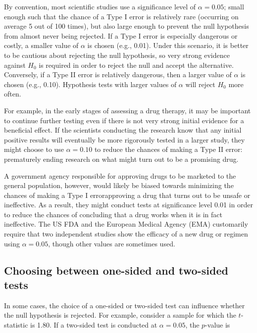 \label{significanceLevel}

By convention, most scientific studies use a significance level of $\alpha = 0.05$; small enough such that the chance of a Type I error is relatively rare (occurring on average 5 out of 100 times), but also large enough to prevent the null hypothesis from almost never being rejected. If a Type I error is especially dangerous or costly, a smaller value of $\alpha$ is chosen (e.g., 0.01). Under this scenario, it is better to be cautious about rejecting the null hypothesis, so very strong evidence against $H_0$ is required in order to reject the null and accept the alternative. Conversely, if a Type II error is relatively dangerous, then a larger value of $\alpha$ is chosen (e.g., 0.10). Hypothesis tests with larger values of $\alpha$ will reject $H_0$ more often.

For example, in the early stages of assessing a drug therapy, it may be important to continue further testing even if there is not very strong initial evidence for a beneficial effect. If the scientists conducting the research know that any initial positive results will eventually be more rigorously tested in a larger study, they might choose to use $\alpha = 0.10$ to reduce the chances of making a Type II error: prematurely ending research on what might turn out to be a promising drug.


A government agency responsible for approving drugs to be marketed to the general population, however, would likely be biased towards minimizing the chances of making a Type I error\textemdash approving a drug that turns out to be unsafe or ineffective. As a result, they might conduct tests at significance level 0.01 in order to reduce the chances of concluding that a drug works when it is in fact ineffective. The US FDA and the European Medical Agency (EMA) customarily require that two independent studies show the efficacy of a new drug or regimen using $\alpha = 0.05$, though other values are sometimes used.\textD{\vspace{5mm}}


\subsection{Choosing between one-sided and two-sided tests}

In some cases, the choice of a one-sided or two-sided test can influence whether the null hypothesis is rejected. For example, consider a sample for which the $t$-statistic is 1.80. If a two-sided test is conducted at $\alpha = 0.05$, the $p$-value is

